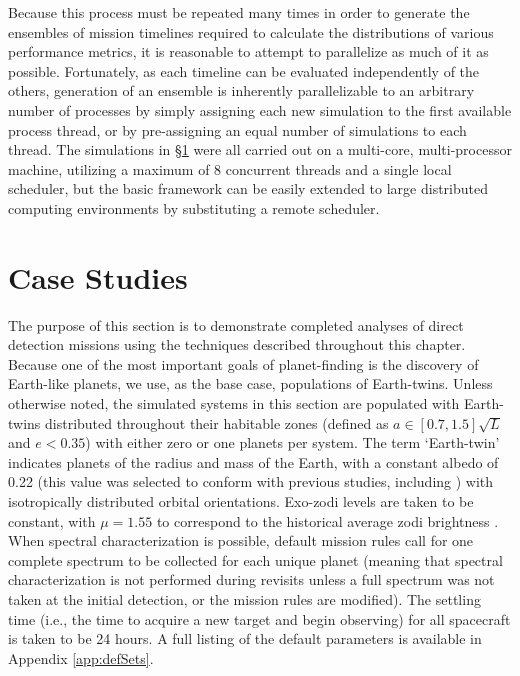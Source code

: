 Because this process must be repeated many times in order to generate the ensembles of mission timelines required to calculate the distributions of various performance metrics, it is reasonable to attempt to parallelize as much of it as possible.  Fortunately, as each timeline can be evaluated independently of the others, generation of an ensemble is inherently parallelizable to an arbitrary number of processes by simply assigning each new simulation to the first available  process thread, or by pre-assigning an equal number of simulations to each thread.  The simulations in \S\ref{sec:case_studies} were all carried out on a multi-core, multi-processor machine, utilizing a maximum of 8 concurrent threads and a single local scheduler, but the basic framework can be easily extended to large distributed computing environments by substituting a remote scheduler.

\section{Case Studies}\label{sec:case_studies}

The purpose of this section is to demonstrate completed analyses of direct detection missions using the techniques described throughout this chapter.  Because one of the most important goals of planet-finding is the discovery of Earth-like planets, we use, as the base case, populations of Earth-twins.  Unless otherwise noted, the simulated systems in this section are populated with Earth-twins distributed throughout their habitable zones (defined as $a \in [0.7, 1.5]\sqrt{L}$ and $e < 0.35$) with either zero or one planets per system.  The term `Earth-twin' indicates planets of the radius and mass of the Earth, with a constant albedo of 0.22 (this value was selected to conform with previous studies, including \citet{lindler2007}) with isotropically distributed orbital orientations.  Exo-zodi levels are taken to be constant, with $\mu = 1.55$ to correspond to the historical average zodi brightness \citep{kuchner2008}.  When spectral characterization is possible, default mission rules call for one complete spectrum to be collected for each unique planet (meaning that spectral characterization is not performed during revisits unless a full spectrum was not taken at the initial detection, or the mission rules are modified). The settling time (i.e., the time to acquire a new target and begin observing) for all spacecraft is taken to be 24 hours. A full listing of the default parameters is available in Appendix \ref{app:defSets}.

